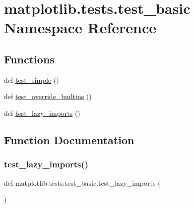 \hypertarget{namespacematplotlib_1_1tests_1_1test__basic}{}\section{matplotlib.\+tests.\+test\+\_\+basic Namespace Reference}
\label{namespacematplotlib_1_1tests_1_1test__basic}
\subsection*{Functions}
\begin{DoxyCompactItemize}
\item 
def \hyperlink{namespacematplotlib_1_1tests_1_1test__basic_a13ca3ac5af29fcd46dc0027b422958ff}{test\+\_\+simple} ()
\item 
def \hyperlink{namespacematplotlib_1_1tests_1_1test__basic_a258f5ee003d3b294d8126d226d1a281f}{test\+\_\+override\+\_\+builtins} ()
\item 
def \hyperlink{namespacematplotlib_1_1tests_1_1test__basic_ae76855fe31152a5ebc9030b147093f92}{test\+\_\+lazy\+\_\+imports} ()
\end{DoxyCompactItemize}


\subsection{Function Documentation}
\mbox{\label{namespacematplotlib_1_1tests_1_1test__basic_ae76855fe31152a5ebc9030b147093f92}} 
\subsubsection{\texorpdfstring{test\+\_\+lazy\+\_\+imports()}{test\_lazy\_imports()}}
{\footnotesize\ttfamily def matplotlib.\+tests.\+test\+\_\+basic.\+test\+\_\+lazy\+\_\+imports (\begin{DoxyParamCaption}{ }\end{DoxyParamCaption})}

\mbox{\label{namespacematplotlib_1_1tests_1_1test__basic_a258f5ee003d3b294d8126d226d1a281f}} 
